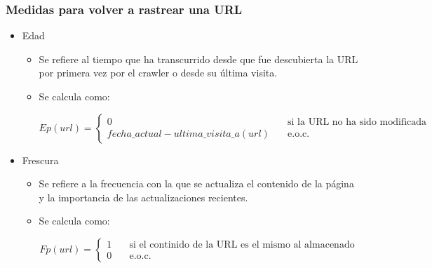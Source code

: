 \documentclass[
10pt, %
aspectratio=169, %
]{beamer}
\begin{document}
	\begin{frame}
		
		\frametitle{Medidas para volver a rastrear una URL}
		
		\begin{itemize}
			
			\item Edad
			\begin{itemize}
				\item Se refiere al tiempo que ha transcurrido desde que fue descubierta la URL por primera vez por el crawler o desde su última visita.
				\item Se calcula como:
				
				\begin{equation}
					Ep(url) = \left\{
					\begin{aligned}
						0 & \quad \text{si la URL no ha sido modificada} \\
						fecha\_actual - ultima\_visita\_a(url) & \quad \text{e.o.c.}
					\end{aligned} \nonumber
					\right.
				\end{equation}
				
			\end{itemize}
			
			\item Frescura
			\begin{itemize}
				\item Se refiere a la frecuencia con la que se actualiza el contenido de la página y la importancia de las actualizaciones recientes.
				\item Se calcula como:
				
				\begin{equation}
					Fp(url) = \left\{
					\begin{aligned}
						1 & \quad \text{si el continido de la URL es el mismo al almacenado} \\
						0 & \quad \text{e.o.c.}
					\end{aligned} \nonumber
					\right.
				\end{equation}
				
			\end{itemize}
			
		\end{itemize}
		
	\end{frame}
	
\end{document}
